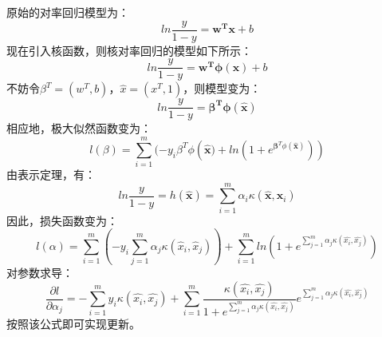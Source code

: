 \documentclass{ctexart}
\begin{document}
    \answer[6.9]
原始的对率回归模型为：
$$
ln\frac{y}{1-y} = \boldsymbol{w^Tx}+b
$$
现在引入核函数，则核对率回归的模型如下所示：
$$
ln\frac{y}{1-y} = \boldsymbol{w^T\phi (x)}+b
$$
不妨令$\beta^T = (w^T, b)$，$\hat{x}=(x^T , 1)$，则模型变为：
$$
ln\frac{y}{1-y} = \boldsymbol{\beta^T\phi (\hat{x})}
$$
相应地，极大似然函数变为：
$$
l(\beta) = \sum_{i=1}^{m}(-y_i\beta^T\phi({\hat{\boldsymbol{x}})}+ln(1+e^{\boldsymbol{\beta}^T\phi (\hat{\boldsymbol{x}})}))
$$
由表示定理，有：
$$
ln\frac{y}{1-y}=h(\boldsymbol{\hat x})=\sum_{i=1}^m\alpha_i\kappa(\hat{\boldsymbol{x}},\hat{\boldsymbol{x}_i}) 
$$
因此，损失函数变为：
$$
l(\alpha)=\sum_{i=1}^m(-y_i\sum_{j=1}^m\alpha_j\kappa(\hat{x}_i,\hat{x}_j))
+\sum_{i=1}^m ln(1+e^{\sum_{j=1}^m\alpha_j\kappa(\hat{x_i},\hat{x_j})})
$$
对参数求导：
$$
\frac{\partial l}{\partial \alpha_j}=-\sum_{i=1}^m y_i\kappa(\hat{x_i},\hat{x_j})
+\sum_{i=1}^m\frac{\kappa(\hat{x_i},\hat{x_j})}{1+e^{\sum_{j=1}^m \alpha_j\kappa(\hat{x_i},\hat{x_j})}}
e^{\sum_{j=1}^m \alpha_j\kappa(\hat{x_i},\hat{x_j})}
$$
按照该公式即可实现更新。
\end{document}
